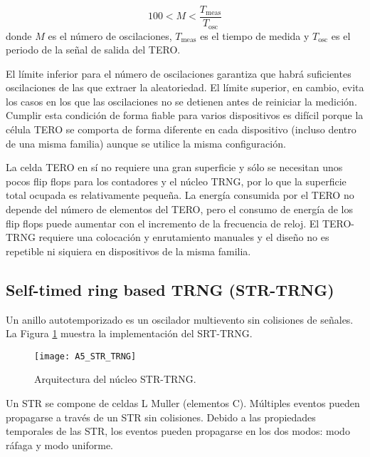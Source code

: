             \begin{equation}
                100 < M < \frac{T_{\text{meas}}}{T_{\text{osc}}} 
                \label{eq:limites_tero}
            \end{equation}
            donde $M$ es el número de oscilaciones, $T_{\text{meas}}$ es el tiempo de medida y $T_{\text{osc}}$ es el periodo de la señal de salida del TERO.

            El límite inferior para el número de oscilaciones garantiza que habrá suficientes oscilaciones de las que extraer la aleatoriedad. El límite superior, en cambio, evita los casos en los que las oscilaciones no se detienen antes de reiniciar la medición. Cumplir esta condición de forma fiable para varios dispositivos es difícil porque la célula TERO se comporta de forma diferente en cada dispositivo (incluso dentro de una misma familia) aunque se utilice la misma configuración.

                La celda TERO en sí no requiere una gran superficie y sólo se necesitan unos pocos flip flops para los contadores y el núcleo TRNG, por lo que la superficie total ocupada es relativamente pequeña. La energía consumida por el TERO no depende del número de elementos del TERO, pero el consumo de energía de los flip flops puede aumentar con el incremento de la frecuencia de reloj. El TERO-TRNG requiere una colocación y enrutamiento manuales y el diseño no es repetible ni siquiera en dispositivos de la misma familia.
				
		\subsection{Self-timed ring based TRNG (STR-TRNG)}

                Un anillo autotemporizado es un oscilador multievento sin colisiones de señales. La Figura \ref{fig:A5_STR_TRNG} muestra la implementación del SRT-TRNG.
	
				\begin{figure}[hbtp]
					\caption{Arquitectura del núcleo STR-TRNG.}
					\centering
					\texttt{[image: A5\_STR\_TRNG]}
					\label{fig:A5_STR_TRNG}
				\end{figure}

                Un STR se compone de celdas L Muller (elementos C). Múltiples eventos pueden propagarse a través de un STR sin colisiones. Debido a las propiedades temporales de las STR, los eventos pueden propagarse en los dos modos: modo ráfaga y modo uniforme.

